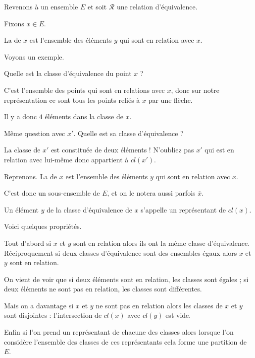 Revenons à un ensemble $E$ et soit $\mathcal{R}$ une relation d'équivalence.

Fixons $x\in E$. 

La  de $x$ est l'ensemble des éléments $y$ qui sont en relation avec $x$.

\change

Voyons un exemple.

Quelle est la classe d'équivalence du point $x$ ?

C'est l'ensemble des points qui sont en relations avec $x$, 
donc sur notre représentation ce sont tous les points reliés
à $x$ par une flèche.

\change

Il y a donc $4$ éléments dans la classe de $x$.

Même question avec $x'$. Quelle est sa classe d'équivalence ?

\change

La classe de $x'$ est constituée de deux éléments ! N'oubliez pas $x'$
qui est en relation avec lui-même donc appartient à $cl(x')$.


\diapo

Reprenons. La  de $x$ est l'ensemble des éléments $y$ qui sont en relation avec $x$.

C'est donc un sous-ensemble de $E$, et on le notera aussi parfois $\overline{x}$.

\change

Un élément $y$ de la classe d'équivalence de $x$ s'appelle un représentant de $cl(x)$.

\change

Voici quelques propriétés.

Tout d'abord si $x$ et $y$ sont en relation alors ils ont la même classe d'équivalence.
Réciproquement si deux classes d'équivalence sont des ensembles égaux alors $x$ et $y$ sont en relation.

\change

On vient de voir que si deux éléments sont en relation, les classes sont égales ;
si deux éléments ne sont pas en relation, les classes sont différentes.

Mais on a davantage si  $x$ et  $y$ ne sont pas en relation alors les classes de $x$ et $y$ sont disjointes :
l'intersection de $cl(x)$ avec $cl(y)$ est vide.

\change

Enfin si l'on prend un représentant de chacune des classes alors lorsque l'on considère
l'ensemble des classes de ces représentants cela forme une partition de $E$.


